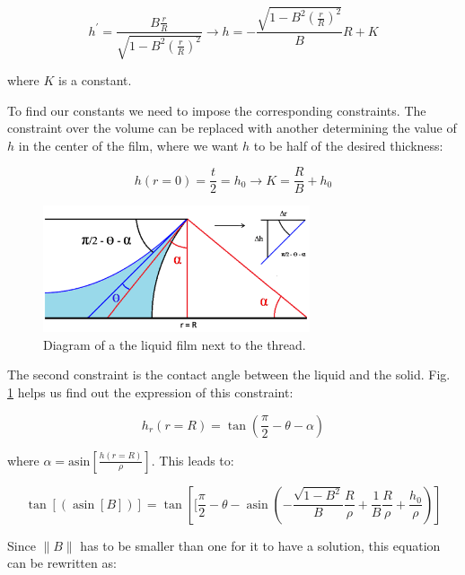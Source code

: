 \begin{equation}
h^{\prime}=\frac{B \frac{r}{R}}{\sqrt{1-B^{2} \left(\frac{r}{R}\right)^2}} \rightarrow h=-\frac{\sqrt{1-B^{2} \left(\frac{r}{R}\right)^2}}{B} R + K
\end{equation}

where $K$ is a constant.

To find our constants we need to impose the corresponding constraints. The constraint over the volume can be replaced with another determining the value of $h$ in the center of the film, where we want $h$ to be half of the desired thickness:

\begin{equation}
h(r=0) = \frac{t}{2} = h_0 \rightarrow K = \frac{R}{B} + h_0
\end{equation}

\begin{figure}[H]
	\centering
	\includegraphics[width=0.7\textwidth]{archivos/geom_film.png}
	\caption{Diagram of a the liquid film next to the thread.}
	\label{geom_film}
\end{figure}

The second constraint is the contact angle between the liquid and the solid. Fig. \ref{geom_film} helps us find out the expression of this constraint:

\begin{equation}
h_r(r=R)=\tan \left(\frac{\pi}{2}-\theta-\alpha\right) 
\end{equation}

where $\alpha=\textrm{asin} \left[\frac{h(r=R)}{\rho}\right]$. This leads to:

\begin{equation}
\tan[(\operatorname{asin}[B])] = \tan \left[[\frac{\pi}{2}-\theta-\operatorname{asin}\left(-\frac{\sqrt{1-B^{2}}}{B} \frac{R}{\rho}+\frac{1}{B}\frac{R}{\rho}+\frac{h_0}{\rho}\right)\right]
\end{equation}

Since $\|B\|$ has to be smaller than one for it to have a solution, this equation can be rewritten as:

